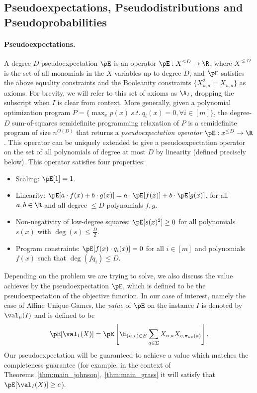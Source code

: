 \subsection{Pseudoexpectations, Pseudodistributions and Pseudoprobabilities}
\paragraph{Pseudoexpectations.}
A degree $D$ pseudoexpectation $\pE$ is an operator $\pE:X^{\le D} \to \R$, where $X^{\le D}$ is the set of all monomials in the $X$ variables up to degree $D$, and $\pE$ satisfies the above equality constraints and the Booleanity constraints $\{X_{u,a}^2 = X_{u,a}\}$ as axioms.  For brevity, we will refer to this set of axioms as $\A_{I}$, dropping the subscript when $I$ is clear from context. More generally, given a polynomial optimization program $P = \{\max_{x} p(x) \ s.t. ~ q_i(x) = 0, \forall i \in [m] \}$, the degree-$D$ sum-of-squares semidefinite programming relaxation of $P$ is a semidefinite program of size $n^{O(D)}$ that returns a {\em pseudoexpectation operator} $\pE: x^{\le D} \to \R$. This operator can be uniquely extended to give a pseudoexpectation operator on the set of all polynomials of degree at most $D$ by linearity (defined precisely below).
This operator satisfies four properties:
\begin{itemize}
\item Scaling: $\pE[1] = 1$.
\item Linearity: $\pE[a \cdot f(x) + b \cdot g(x)] = a\cdot \pE[f(x)] + b \cdot \pE[g(x)]$, for all $a,b \in \R$ and all degree $\leq D$ polynomials $f,g$. 
\item Non-negativity of low-degree squares: $\pE[s(x)^2] \ge 0$ for all polynomials $s(x)$ with $\deg(s) \le \tfrac{D}{2}$.
\item Program constraints: $\pE[f(x) \cdot q_i(x)] = 0$ for all $i \in [m]$ and polynomials $f(x)$ such that $\deg(fq_i) \le D$.
\end{itemize}
Depending on the problem we are trying to solve, we also 
discuss the value achieves by the pseudoexpectation $\pE$, 
which is defined to be the pseudoexpectation of the objective 
function. In our case of interest, namely the case of Affine 
Unique-Games, the \emph{value} of $\pE$ on the instance $I$ is denoted by $\val_\mu(I)$ and is defined to be 
\[
\pE[\val_{I}(X)] = \pE \left[ \E_{(u,v) \in E} \sum_{a \in \Sigma} X_{u,a} X_{v,\pi_{uv}(a)}\right].
\]
Our pseudoexpectation will be guaranteed to achieve a value which matches the completeness guarantee (for example, in 
the context of Theorems~\ref{thm:main_johnson},~\ref{thm:main_grass} it will satisfy that $\pE[\val_{I}(X)]\geq c$).

